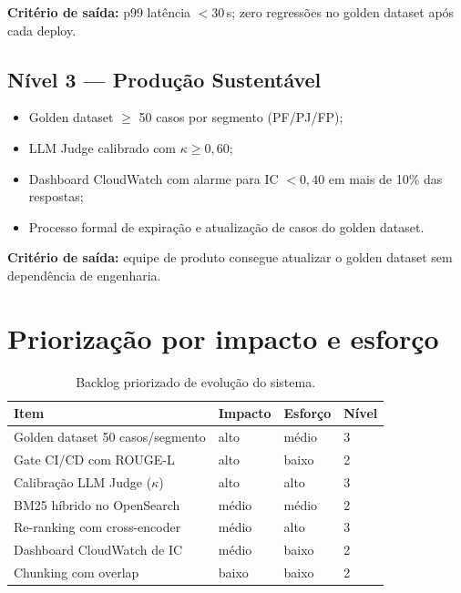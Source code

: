 \textbf{Crit\'erio de sa\'ida:} p99 lat\^encia $< 30$\,s; zero regress\~oes
no golden dataset ap\'os cada deploy.

\subsection{N\'ivel 3 --- Produ\c{c}\~ao Sustent\'avel}

\begin{itemize}[leftmargin=*]
  \item Golden dataset $\geq$ 50 casos por segmento (PF/PJ/FP);
  \item LLM Judge calibrado com $\kappa \geq 0{,}60$;
  \item Dashboard CloudWatch com alarme para IC $< 0{,}40$ em mais
        de 10\% das respostas;
  \item Processo formal de expira\c{c}\~ao e atualiza\c{c}\~ao de
        casos do golden dataset.
\end{itemize}

\textbf{Crit\'erio de sa\'ida:} equipe de produto consegue atualizar
o golden dataset sem depend\^encia de engenharia.

\section{Prioriza\c{c}\~ao por impacto e esfor\c{c}o}

\begin{table}[htbp]
\centering
\caption{Backlog priorizado de evolu\c{c}\~ao do sistema.}
\label{tab:roadmap_backlog}
\begin{tabular}{llll}
\toprule
\textbf{Item} & \textbf{Impacto} & \textbf{Esfor\c{c}o} & \textbf{N\'ivel} \\
\midrule
Golden dataset 50 casos/segmento     & alto   & m\'edio & 3 \\
Gate CI/CD com ROUGE-L               & alto   & baixo   & 2 \\
Calibra\c{c}\~ao LLM Judge ($\kappa$) & alto  & alto    & 3 \\
BM25 h\'ibrido no OpenSearch         & m\'edio & m\'edio & 2 \\
Re-ranking com cross-encoder         & m\'edio & alto    & 3 \\
Dashboard CloudWatch de IC           & m\'edio & baixo   & 2 \\
Chunking com overlap                 & baixo  & baixo   & 2 \\
\bottomrule
\end{tabular}
\end{table}

